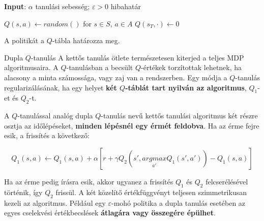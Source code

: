 \documentclass[english, aspectratio=169]{beamer}
\begin{document}
\begin{frame}{}
\begin{algorithm}[H]
\caption{$Q$-tanulás algoritmusa $\pi \approx \pi_*$ megbecslésére}
\SetAlgoLined
\textbf{Input}: $\alpha$ tanulási sebesség; $\varepsilon > 0$ hibahatár\par
$Q(s,a) \leftarrow random()$ for $s \in S$, $a \in A$
$Q(s_T,\cdot) \leftarrow 0$
\end{algorithm}
A politikát a $Q$-tábla határozza meg.
\end{frame}

\begin{frame}{Dupla $Q$-tanulás}
A kettős tanulás ötlete természetesen kiterjed a teljes MDP algoritmusaira. A $Q$-tanulásban a becsült $Q$-értékek torzítottak lehetnek, ha alacsony a minta számossága, vagy zaj van a rendszerben. Egy módja a $Q$-tanulás regularizálásának, ha egy helyet\textbf{ két $Q$-táblát tart nyilván az algoritmus}, $Q_1$-et és $Q_2$-t.\par\smallskip
A $Q$-tanulással analóg dupla $Q$-tanulás nevű kettős tanulási algoritmus két részre osztja az időlépéseket, \textbf{minden lépésnél egy érmét feldobva}. Ha az érme fejre esik, a frissítés a következő:
\begin{block}{}
\[
Q_1(s,a) \leftarrow Q_1(s,a) + \alpha \left[ r + \gamma Q_2 \left(s', \underset{a'}{argmax} Q_1(s',a')\right) - Q_1(s,a) \right]
\]
\end{block}
Ha az érme pedig írásra esik, akkor ugyanez a frissítés $Q_1$ és $Q_2$ felcserélésével történik, így $Q_2$ frissül. A két közelítő értékfüggvényt teljesen szimmetrikusan kezeli az algoritmus. Például egy $\varepsilon$-mohó politika a dupla tanulás esetében az egyes cselekvési értékbecslések \textbf{átlagára vagy összegére épülhet}.
\end{frame}
\end{document}
